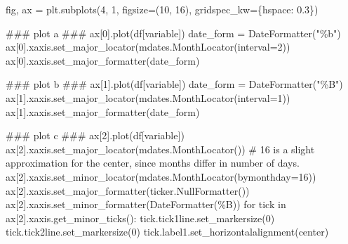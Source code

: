 \documentclass[
  letterpaper,
  DIV=11,
  numbers=noendperiod]{scrreprt}
\newenvironment{Shaded}{\begin{snugshade}}{\end{snugshade}}
\newcommand{\AlertTok}[1]{\textcolor[rgb]{0.68,0.00,0.00}{#1}}
\newcommand{\CommentTok}[1]{\textcolor[rgb]{0.37,0.37,0.37}{#1}}
\newcommand{\ControlFlowTok}[1]{\textcolor[rgb]{0.00,0.23,0.31}{#1}}
\newcommand{\DecValTok}[1]{\textcolor[rgb]{0.68,0.00,0.00}{#1}}
\newcommand{\FloatTok}[1]{\textcolor[rgb]{0.68,0.00,0.00}{#1}}
\newcommand{\KeywordTok}[1]{\textcolor[rgb]{0.00,0.23,0.31}{#1}}
\newcommand{\NormalTok}[1]{\textcolor[rgb]{0.00,0.23,0.31}{#1}}
\newcommand{\OperatorTok}[1]{\textcolor[rgb]{0.37,0.37,0.37}{#1}}
\newcommand{\StringTok}[1]{\textcolor[rgb]{0.13,0.47,0.30}{#1}}
\begin{document}
\begin{Shaded}
\begin{Highlighting}[]
\NormalTok{fig, ax }\OperatorTok{=}\NormalTok{ plt.subplots(}\DecValTok{4}\NormalTok{, }\DecValTok{1}\NormalTok{, figsize}\OperatorTok{=}\NormalTok{(}\DecValTok{10}\NormalTok{, }\DecValTok{16}\NormalTok{),}
\NormalTok{                       gridspec\_kw}\OperatorTok{=}\NormalTok{\{}\StringTok{\textquotesingle{}hspace\textquotesingle{}}\NormalTok{: }\FloatTok{0.3}\NormalTok{\})}

\CommentTok{\#\#\# plot a }\AlertTok{\#\#\#}
\NormalTok{ax[}\DecValTok{0}\NormalTok{].plot(df[}\StringTok{\textquotesingle{}variable\textquotesingle{}}\NormalTok{])}
\NormalTok{date\_form }\OperatorTok{=}\NormalTok{ DateFormatter(}\StringTok{"\%b"}\NormalTok{)}
\NormalTok{ax[}\DecValTok{0}\NormalTok{].xaxis.set\_major\_locator(mdates.MonthLocator(interval}\OperatorTok{=}\DecValTok{2}\NormalTok{))}
\NormalTok{ax[}\DecValTok{0}\NormalTok{].xaxis.set\_major\_formatter(date\_form)}

\CommentTok{\#\#\# plot b }\AlertTok{\#\#\#}
\NormalTok{ax[}\DecValTok{1}\NormalTok{].plot(df[}\StringTok{\textquotesingle{}variable\textquotesingle{}}\NormalTok{])}
\NormalTok{date\_form }\OperatorTok{=}\NormalTok{ DateFormatter(}\StringTok{"\%B"}\NormalTok{)}
\NormalTok{ax[}\DecValTok{1}\NormalTok{].xaxis.set\_major\_locator(mdates.MonthLocator(interval}\OperatorTok{=}\DecValTok{1}\NormalTok{))}
\NormalTok{ax[}\DecValTok{1}\NormalTok{].xaxis.set\_major\_formatter(date\_form)}

\CommentTok{\#\#\# plot c }\AlertTok{\#\#\#}
\NormalTok{ax[}\DecValTok{2}\NormalTok{].plot(df[}\StringTok{\textquotesingle{}variable\textquotesingle{}}\NormalTok{])}
\NormalTok{ax[}\DecValTok{2}\NormalTok{].xaxis.set\_major\_locator(mdates.MonthLocator())}
\CommentTok{\# 16 is a slight approximation for the center, since months differ in number of days.}
\NormalTok{ax[}\DecValTok{2}\NormalTok{].xaxis.set\_minor\_locator(mdates.MonthLocator(bymonthday}\OperatorTok{=}\DecValTok{16}\NormalTok{))}
\NormalTok{ax[}\DecValTok{2}\NormalTok{].xaxis.set\_major\_formatter(ticker.NullFormatter())}
\NormalTok{ax[}\DecValTok{2}\NormalTok{].xaxis.set\_minor\_formatter(DateFormatter(}\StringTok{\textquotesingle{}\%B\textquotesingle{}}\NormalTok{))}
\ControlFlowTok{for}\NormalTok{ tick }\KeywordTok{in}\NormalTok{ ax[}\DecValTok{2}\NormalTok{].xaxis.get\_minor\_ticks():}
\NormalTok{    tick.tick1line.set\_markersize(}\DecValTok{0}\NormalTok{)}
\NormalTok{    tick.tick2line.set\_markersize(}\DecValTok{0}\NormalTok{)}
\NormalTok{    tick.label1.set\_horizontalalignment(}\StringTok{\textquotesingle{}center\textquotesingle{}}\NormalTok{)}


\end{Highlighting}
\end{Shaded}
\end{document}

